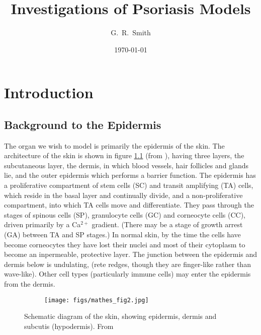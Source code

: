 \documentclass[a4paper,10pt]{report}
\title{\bf Investigations of Psoriasis Models}
\author{G.~R.~Smith}
\date{\today}                           %
\begin{document}
\maketitle                              %
\setcounter{page}{2}                    %
\tableofcontents                        %

\chapter{Introduction}                %

\section{Background to the Epidermis}

The organ we wish to model is primarily the epidermis of the skin. The architecture of the skin is shown in figure \ref{fig:mathes_skinarch} (from \cite{mathes2014use}), having three layers, the subcutaneous layer, the dermis, in which blood vessels, hair follicles and glands lie, and the outer epidermis which performs a barrier function. The epidermis has a proliferative compartment of stem cells (SC) and transit amplifying (TA) cells, which reside in the basal layer and continually divide, and a non-proliferative compartment, into which TA cells move and differentiate. They pass through the stages of spinous cells (SP), granulocyte cells (GC) and corneocyte cells (CC), driven primarily by a Ca$^{2+}$ gradient. (There may be a stage of growth arrest (GA) between TA and SP stages.) In normal skin, by the time the cells have become corneocytes they have lost their nuclei and most of their cytoplasm to become an inpermeable, protective layer. The junction between the epidermis and dermis below is undulating, (rete redges, though they are finger-like rather than wave-like). Other cell types (particularly immune cells) may enter the epidermis from the dermis. 


\begin{figure}[h!]
    \centering  
  \begin{subfigure}{.7\textwidth}
    \texttt{[image: figs/mathes\_fig2.jpg]}
  \end{subfigure}
  \caption{Schematic diagram of the skin, showing epidermis, dermis and subcutis (hypodermis). From \cite{mathes2014use}}
  \label{fig:mathes_skinarch}
\end{figure}
\end{document}

